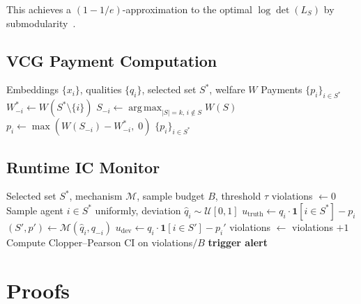 \documentclass[10pt]{article}
\DeclareMathOperator*{\argmax}{arg\,max}
\begin{document}
This achieves a $(1-1/e)$-approximation to the optimal $\log\det(L_S)$ by submodularity~\citep{kulesza2012determinantal}.

\subsection{VCG Payment Computation}

\begin{algorithm}[H]
\caption{VCG Payments for Diverse Selection}
\label{alg:vcg}
\begin{algorithmic}[1]
\REQUIRE Embeddings $\{x_i\}$, qualities $\{q_i\}$, selected set $S^*$, welfare $W$
\ENSURE Payments $\{p_i\}_{i \in S^*}$
  \STATE $W_{-i}^* \leftarrow W(S^* \setminus \{i\})$
  \STATE $S_{-i} \leftarrow \argmax_{|S|=k,\, i \notin S} W(S)$
  \STATE $p_i \leftarrow \max(W(S_{-i}) - W_{-i}^*,\; 0)$
\ENDFOR
\RETURN $\{p_i\}_{i \in S^*}$
\end{algorithmic}
\end{algorithm}

\subsection{Runtime IC Monitor}

\begin{algorithm}[H]
\caption{Runtime IC Violation Monitor}
\label{alg:ic-monitor}
\begin{algorithmic}[1]
\REQUIRE Selected set $S^*$, mechanism $\mathcal{M}$, sample budget $B$, threshold $\tau$
\STATE violations $\leftarrow 0$
  \STATE Sample agent $i \in S^*$ uniformly, deviation $\hat{q}_i \sim \mathcal{U}[0,1]$
  \STATE $u_{\mathrm{truth}} \leftarrow q_i \cdot \mathbf{1}[i \in S^*] - p_i$
  \STATE $(S', p') \leftarrow \mathcal{M}(\hat{q}_i, q_{-i})$
  \STATE $u_{\mathrm{dev}} \leftarrow q_i \cdot \mathbf{1}[i \in S'] - p_i'$
    \STATE violations $\leftarrow$ violations $+ 1$
  \ENDIF
\ENDFOR
\STATE Compute Clopper--Pearson CI on violations$/B$
  \STATE \textbf{trigger alert}
\ENDIF
\end{algorithmic}
\end{algorithm}

\section{Proofs}
\label{app:proofs}
\end{document}
